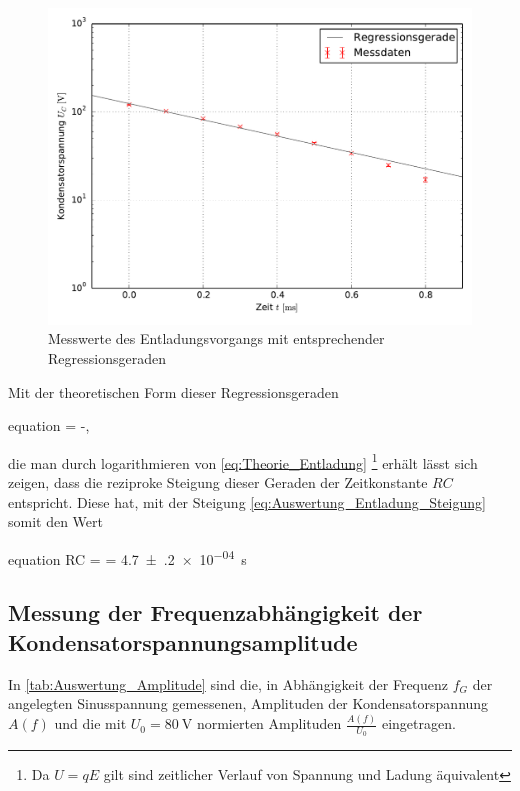 	\begin{figure}[!h]
		\centering
		\includegraphics[scale=0.75]{Grafiken/Entladung.pdf}
		\caption{Messwerte des Entladungsvorgangs mit entsprechender Regressionsgeraden}
		\label{fig:Auswertung_EntladungLog}
	\end{figure}
	 
	Mit der theoretischen Form dieser Regressionsgeraden 
	\begin{empheq}{equation}
		\ln{}  = -, 
	\end{empheq}
	die man durch logarithmieren von \cref{eq:Theorie_Entladung}
	\footnote{Da $ U = qE $ gilt sind zeitlicher Verlauf von Spannung und Ladung äquivalent} erhält
	lässt sich zeigen, dass die reziproke Steigung dieser Geraden der Zeitkonstante $ RC $  entspricht.
	Diese hat, mit der Steigung \cref{eq:Auswertung_Entladung_Steigung} somit den Wert
	\begin{empheq}{equation}
		 RC =   = \SI{4.7(2)e-04}{\second}
	\end{empheq}
	 
	 
	 
\subsection{Messung der Frequenzabhängigkeit der \\ Kondensatorspannungsamplitude}

	In \cref{tab:Auswertung_Amplitude} sind die, in Abhängigkeit der Frequenz $ f_{G} $ der angelegten 
	Sinusspannung gemessenen, Amplituden der Kondensatorspannung $A(f)$ und die mit $ U_{0} = \SI{80}{\volt} $
	normierten Amplituden $ \tfrac{A(f)}{U_{0}} $ eingetragen. 
	
